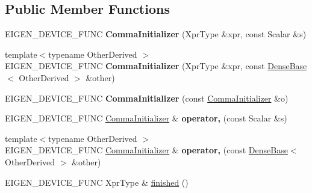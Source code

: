 \subsection*{Public Member Functions}
\begin{DoxyCompactItemize}
\item 
\mbox{\label{struct_eigen_1_1_comma_initializer_aed4e19a5d8bb35516c08385e67feae00}} 
E\+I\+G\+E\+N\+\_\+\+D\+E\+V\+I\+C\+E\+\_\+\+F\+U\+NC {\bfseries Comma\+Initializer} (Xpr\+Type \&xpr, const Scalar \&s)
\item 
\mbox{\label{struct_eigen_1_1_comma_initializer_a55b185ca858afa95645cbc4e97030cee}} 
{\footnotesize template$<$typename Other\+Derived $>$ }\\E\+I\+G\+E\+N\+\_\+\+D\+E\+V\+I\+C\+E\+\_\+\+F\+U\+NC {\bfseries Comma\+Initializer} (Xpr\+Type \&xpr, const \mbox{\hyperlink{class_eigen_1_1_dense_base}{Dense\+Base}}$<$ Other\+Derived $>$ \&other)
\item 
\mbox{\label{struct_eigen_1_1_comma_initializer_a0b4c51ae41d98320e4ee66e27e6f8dfa}} 
E\+I\+G\+E\+N\+\_\+\+D\+E\+V\+I\+C\+E\+\_\+\+F\+U\+NC {\bfseries Comma\+Initializer} (const \mbox{\hyperlink{struct_eigen_1_1_comma_initializer}{Comma\+Initializer}} \&o)
\item 
\mbox{\label{struct_eigen_1_1_comma_initializer_aa86188eae996f009ed0e8ae508b07c5d}} 
E\+I\+G\+E\+N\+\_\+\+D\+E\+V\+I\+C\+E\+\_\+\+F\+U\+NC \mbox{\hyperlink{struct_eigen_1_1_comma_initializer}{Comma\+Initializer}} \& {\bfseries operator,} (const Scalar \&s)
\item 
\mbox{\label{struct_eigen_1_1_comma_initializer_a643641e7710568d39b1e8658817a5912}} 
{\footnotesize template$<$typename Other\+Derived $>$ }\\E\+I\+G\+E\+N\+\_\+\+D\+E\+V\+I\+C\+E\+\_\+\+F\+U\+NC \mbox{\hyperlink{struct_eigen_1_1_comma_initializer}{Comma\+Initializer}} \& {\bfseries operator,} (const \mbox{\hyperlink{class_eigen_1_1_dense_base}{Dense\+Base}}$<$ Other\+Derived $>$ \&other)
\item 
E\+I\+G\+E\+N\+\_\+\+D\+E\+V\+I\+C\+E\+\_\+\+F\+U\+NC Xpr\+Type \& \mbox{\hyperlink{struct_eigen_1_1_comma_initializer_a3be7de7fb3e8d3c4d3063f480181b17f}{finished}} ()
\end{DoxyCompactItemize}
